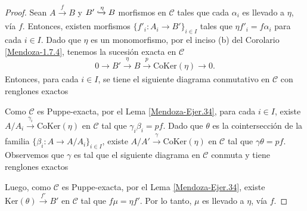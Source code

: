\documentclass[tesis]{subfiles}
\begin{document}
\begin{proof}
    Sean $A\xrightarrow[]{f} B$ y $B'\xhookrightarrow[]{\eta}B$ morfismos en $\mathscr{C}$ tales que cada $\alpha_i$ es llevado a $\eta$, vía $f$. Entonces, existen morfismos $\{f'_i:A_i\to B'\}_{i\in I}$ tales que $\eta f'_i = f\alpha_i$ para cada $i\in I$. Dado que $\eta$ es un monomorfismo, por el inciso (b) del Corolario \ref{Mendoza-1.7.4}, tenemos la sucesión exacta en $\mathscr{C}$
    \[
    0 \to B'\xrightarrow[]{\eta} B\xrightarrow[]{p} \text{CoKer}(\eta)\to 0.
    \] 
    Entonces, para cada $i\in I$, se tiene el siguiente diagrama conmutativo en $\mathscr{C}$ con renglones exactos
    \begin{center}
    \end{center}
    Como $\mathscr{C}$ es Puppe-exacta, por el Lema \ref{Mendoza-Ejer.34}, para cada $i\in I$, existe $A/A_i\xrightarrow[]{\gamma_i} \text{CoKer}(\eta)$ en $\mathscr{C}$ tal que $\gamma_i\beta_i=pf$. Dado que $\theta$ es la cointersección de la familia $\{\beta_i:A\to A/A_i\}_{i\in I}$, existe $A/A'\xrightarrow[]{\gamma} \text{CoKer}(\eta)$ en $\mathscr{C}$ tal que $\gamma\theta = pf$. Observemos que $\gamma$ es tal que el siguiente diagrama en $\mathscr{C}$ conmuta y tiene renglones exactos
    \begin{center}
    \end{center}
    Luego, como $\mathscr{C}$ es Puppe-exacta, por el Lema \ref{Mendoza-Ejer.34}, existe $\text{Ker}(\theta)\xrightarrow[]{f'} B'$ en $\mathscr{C}$ tal que $f\mu=\eta f'$. Por lo tanto, $\mu$ es llevado a $\eta$, vía $f$.
\end{proof}
\end{document}
